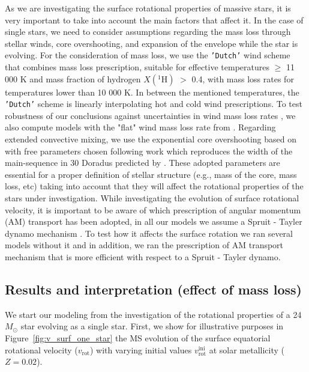 \documentclass{aa}
\DeclareRobustCommand{\Figref}[1]{Figure~\ref{#1}}
\begin{document}
As we are investigating the surface rotational properties of massive stars, it is very important to take into account the main factors that affect it. In the case of single stars, we need to consider assumptions regarding the
mass loss through stellar winds, core overshooting, and expansion of the envelope while the star is evolving. For the consideration of mass loss, we use the \texttt{'Dutch'}
wind scheme that combines \citet{Vink_2001} mass loss prescription,
suitable for effective temperatures $\geq$ 11 000 K and mass fraction
of hydrogen $X(^{1}\mathrm{H})$ $>$ 0.4, with \citet{Jager_1988}
mass loss rates for temperatures lower than 10 000 K. In between the
mentioned temperatures, the \texttt{'Dutch'} scheme is linearly
interpolating hot and cold wind prescriptions.
To test robustness of our conclusions against uncertainties in wind mass loss rates \citep{renzo:17}, we also compute models with the "flat" wind mass loss rate from \citet{Bjorklund_2023}.
 Regarding extended convective mixing, we use the exponential core overshooting based on
\citet{Herwig_2000} with free parameters chosen following
\cite{claret:18} work which reproduces the width of the main-sequence in 30
Doradus predicted by \citet{Brott_2011}. These adopted parameters are essential for a proper definition of stellar
structure (e.g., mass of the core, mass loss, etc) taking into account
that they will affect the rotational properties of the stars under
investigation.
While investigating the evolution of surface rotational velocity, it is important to be aware of which prescription of angular momentum (AM) transport has been adopted, in all our models we assume a Spruit - Tayler dynamo mechanism \citep{spruit:02}.
To test how it affects the surface rotation we ran several models without it and in addition, we ran the prescription of \citet{fuller:19} AM transport mechanism that is more efficient with respect to a Spruit - Tayler dynamo.


\subsection{Results and interpretation (effect of mass loss)}
\label{sec:res_primordial}


We start our modeling from the investigation of the rotational
properties of a 24\,$M_{\odot}$ star evolving as a single star. First, we
show for illustrative purposes in \Figref{fig:v_surf_one_star} the MS
evolution of the surface equatorial rotational velocity
($v_\mathrm{rot}$) with varying initial values
$v_\mathrm{rot}^\mathrm{ini}$ at solar metallicity ($Z=0.02$).
\end{document}
